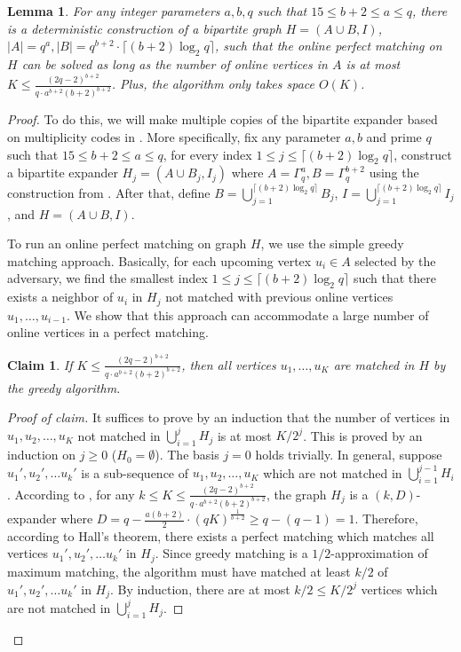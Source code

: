 \documentclass[11pt,a4paper]{article}
\newtheorem{lemma}{Lemma}[section]
\newtheorem{claim}{Claim}[section]
\newcommand{\ceil}[1]{\lceil #1 \rceil}
\begin{document}
\begin{lemma}\label{perfect}
	For any integer parameters $a, b, q$ such that $15\leq b+2\leq a\leq q$, there is a deterministic construction of a bipartite graph $H = (A\cup B, I)$, $|A| = q^a, |B|= q^{b+2}\cdot \ceil{(b+2)\log_2 q}$, such that the online perfect matching on $H$ can be solved as long as the number of online vertices in $A$ is at most $K\leq \frac{(2q-2)^{b+2}}{q\cdot a^{b+2}(b+2)^{b+2}}$. Plus, the algorithm only takes space $O(K)$.
\end{lemma}
\begin{proof}
	To do this, we will make multiple copies of the bipartite expander based on multiplicity codes in . More specifically, fix any parameter $a, b$ and prime $q$ such that $15\leq b+2\leq a\leq q$, for every index $1\leq j\leq \lceil (b+2)\log_2 q\rceil$, construct a bipartite expander $H_j = (A\cup B_j, I_j)$ where $A = \Gamma_q^a, B = \Gamma_q^{b+2}$ using the construction from . After that, define $B = \bigcup_{j=1}^{\lceil (b+2)\log_2 q\rceil} B_j$, $I = \bigcup_{j=1}^{\lceil (b+2)\log_2 q\rceil} I_j$, and $H = (A\cup B, I)$.
	
	To run an online perfect matching on graph $H$, we use the simple greedy matching approach. Basically, for each upcoming vertex $u_i\in A$ selected by the adversary, we find the smallest index $1\leq j\leq \lceil (b+2)\log_2 q\rceil$ such that there exists a neighbor of $u_i$ in $H_j$ not matched with previous online vertices $u_1, \ldots, u_{i-1}$. We show that this approach can accommodate a large number of online vertices in a perfect matching.
	
	\begin{claim}
		If $K \leq \frac{(2q-2)^{b+2}}{q\cdot a^{b+2}(b+2)^{b+2}}$, then all vertices $u_1, \ldots, u_K$ are matched in $H$ by the greedy algorithm.
	\end{claim}
	\begin{proof}[Proof of claim]
		It suffices to prove by an induction that the number of vertices in $u_1, u_2, \ldots, u_K$ not matched in $\bigcup_{i=1}^j H_j$ is at most $K / 2^j$. This is proved by an induction on $j\geq 0$ ($H_0 = \emptyset$). The basis $j = 0$ holds trivially. In general, suppose $u_1', u_2', \ldots u_k'$ is a sub-sequence of $u_1, u_2, \ldots, u_K$ which are not matched in $\bigcup_{i=1}^{j-1}H_i$. According to , for any $k\leq K \leq \frac{(2q-2)^{b+2}}{q\cdot a^{b+2}(b+2)^{b+2}}$, the graph $H_j$ is a $(k, D)$-expander where $D = q - \frac{a(b+2)}{2}\cdot (qK)^{\frac{1}{b+2}} \geq q - (q-1) = 1$. Therefore, according to Hall's theorem, there exists a perfect matching which matches all vertices $u_1', u_2', \ldots u_k'$ in $H_j$. Since greedy matching is a $1/2$-approximation of maximum matching, the algorithm must have matched at least $k/2$ of $u_1', u_2', \ldots u_k'$ in $H_j$. By induction, there are at most $k/2 \leq K/2^j$ vertices which are not matched in $\bigcup_{i=1}^j H_j$.
	\end{proof}
\end{proof}
\end{document}

